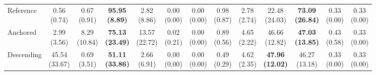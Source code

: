 {\begin{tabular}{l|cccccc|cccccc}
Reference & \makecell{0.56 \\ (0.74)} & \makecell{0.67 \\ (0.91)} & {\cellcolor[HTML]{C8E6C9}} \bfseries \makecell{95.95 \\ (8.89)} & \makecell{2.82 \\ (8.86)} & \makecell{0.00 \\ (0.00)} & \makecell{0.00 \\ (0.00)} & \makecell{0.98 \\ (0.87)} & \makecell{2.78 \\ (2.74)} & {\cellcolor[HTML]{C8E6C9}} \makecell{22.48 \\ (24.03)} & \bfseries \makecell{73.09 \\ (26.84)} & \makecell{0.33 \\ (0.00)} & \makecell{0.33 \\ (0.00)} \\
Anchored & \makecell{2.99 \\ (3.56)} & \makecell{8.29 \\ (10.84)} & {\cellcolor[HTML]{C8E6C9}} \bfseries \makecell{75.13 \\ (23.49)} & \makecell{13.57 \\ (22.72)} & \makecell{0.02 \\ (0.21)} & \makecell{0.00 \\ (0.00)} & \makecell{0.89 \\ (0.56)} & \makecell{4.65 \\ (2.22)} & {\cellcolor[HTML]{C8E6C9}} \makecell{46.66 \\ (12.82)} & \bfseries \makecell{47.03 \\ (13.85)} & \makecell{0.43 \\ (0.58)} & \makecell{0.33 \\ (0.00)} \\
Descending & \makecell{45.54 \\ (33.67)} & \makecell{0.69 \\ (3.51)} & {\cellcolor[HTML]{C8E6C9}} \bfseries \makecell{51.11 \\ (33.86)} & \makecell{2.66 \\ (6.91)} & \makecell{0.00 \\ (0.00)} & \makecell{0.00 \\ (0.00)} & \makecell{0.49 \\ (0.29)} & \makecell{4.62 \\ (2.35)} & {\cellcolor[HTML]{C8E6C9}} \bfseries \makecell{47.96 \\ (12.02)} & \makecell{46.27 \\ (13.18)} & \makecell{0.33 \\ (0.00)} & \makecell{0.33 \\ (0.00)} \\
\bottomrule
\end{tabular}
}%
